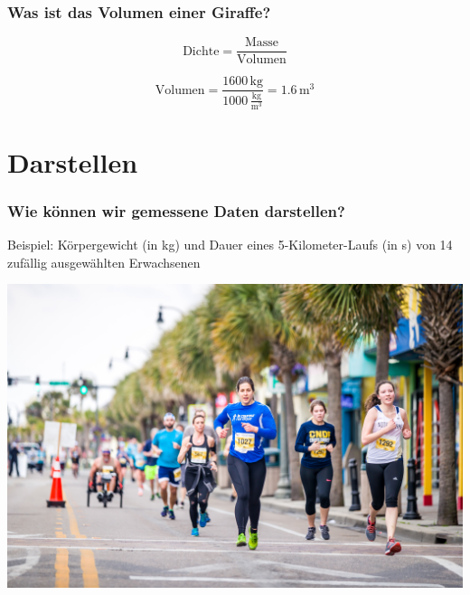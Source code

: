 \documentclass{beamer}
\begin{document}
\begin{frame}
\frametitle{Was ist das Volumen einer Giraffe?}


\[ 
\text{Dichte}  = \frac{\text{Masse}}{\text{Volumen}}
\]
 
\[
\text{Volumen} =  \frac{1600\,\text{kg}}{1000\,\frac{\text{kg}}{\text{m}^3}} =    1.6\,\text{m}^3
\]


\end{frame}

 

\begin{frame}
\end{frame}


\section{Darstellen}

\begin{frame}
\frametitle{Wie können wir gemessene Daten darstellen?}

Beispiel: Körpergewicht (in kg) und Dauer eines 5-Kilometer-Laufs (in s) von 14 zufällig ausgewählten Erwachsenen
 
\begin{center}
\includegraphics[width=\textwidth]{runners.jpg}
\end{center}

\end{frame}
\end{document}
